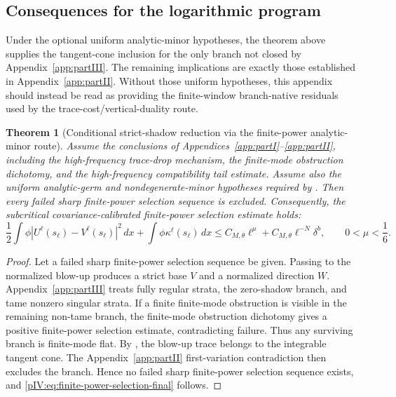 \documentclass[11pt]{article}
\numberwithin{equation}{section}
\theoremstyle{plain}
\newtheorem{theorem}{Theorem}[section]
\theoremstyle{definition}
\theoremstyle{remark}
\newcommand{\dx}{\,dx}
\begin{document}
\subsection{Consequences for the logarithmic program}
\label{pIV:sec:closing}

Under the optional uniform analytic-minor hypotheses, the theorem above supplies the tangent-cone inclusion for the only branch not
closed by Appendix~\ref{app:partIII}. The remaining implications are exactly those established in Appendix~\ref{app:partII}.  Without those uniform hypotheses, this appendix should instead be read as providing the finite-window branch-native residuals used by the trace-cost/vertical-duality route.

\begin{theorem}[Conditional strict-shadow reduction via the finite-power analytic-minor route]
\label{pIV:thm:strict-shadow-closure}
Assume the conclusions of Appendices~\ref{app:partI}--\ref{app:partII}, including the high-frequency trace-drop
mechanism, the finite-mode obstruction dichotomy, and the high-frequency compatibility
tail estimate.  Assume also the uniform analytic-germ and nondegenerate-minor hypotheses required by .  Then every failed sharp finite-power selection sequence is excluded.
Consequently, the subcritical covariance-calibrated finite-power selection estimate holds:
\begin{equation}\label{pIV:eq:finite-power-selection-final}
        \frac12\int\phi |U^\ell(s_\ell)-V^\ell(s_\ell)|^2\dx
        +\int\phi\kappa^\ell(s_\ell)\dx
        \le C_{M,\theta}\ell^\mu+C_{M,\theta}\ell^{-N}\delta^b,
        \qquad
        0<\mu<\frac16.
\end{equation}
\end{theorem}

\begin{proof}
Let a failed sharp finite-power selection sequence be given. Passing to the normalized
blow-up produces a strict base \(V\) and a normalized direction \(W\). Appendix~\ref{app:partIII} treats
fully regular strata, the zero-shadow branch, and tame nonzero singular strata. If a finite
finite-mode obstruction is visible in the remaining non-tame branch, the finite-mode
obstruction dichotomy gives a positive finite-power selection estimate, contradicting
failure. Thus any surviving branch is finite-mode flat. By
, the blow-up trace belongs to the integrable
tangent cone. The Appendix~\ref{app:partII} first-variation contradiction then excludes the branch.
Hence no failed sharp finite-power selection sequence exists, and
\eqref{pIV:eq:finite-power-selection-final} follows.
\end{proof}
\end{document}

